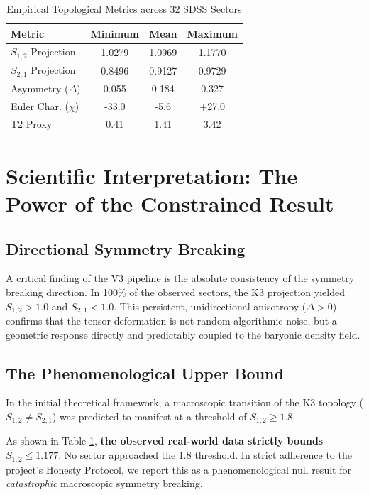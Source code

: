 \documentclass[aps,prd,twocolumn,nofootinbib,superscriptaddress,10pt]{revtex4-2}
\begin{document}
\begin{table}[h]
\centering
\caption{Empirical Topological Metrics across 32 SDSS Sectors}
\label{tab:results}
\begin{tabular}{@{}lccc@{}}
\toprule
\textbf{Metric} & \textbf{Minimum} & \textbf{Mean} & \textbf{Maximum} \\ \midrule
$S_{1,2}$ Projection & 1.0279 & 1.0969 & 1.1770 \\
$S_{2,1}$ Projection & 0.8496 & 0.9127 & 0.9729 \\
Asymmetry ($\Delta$) & 0.055 & 0.184 & 0.327 \\
Euler Char. ($\chi$) & -33.0 & -5.6 & +27.0 \\
T2 Proxy & 0.41 & 1.41 & 3.42 \\ \bottomrule
\end{tabular}
\end{table}

\section{Scientific Interpretation: The Power of the Constrained Result}

\subsection{Directional Symmetry Breaking}
A critical finding of the V3 pipeline is the absolute consistency of the symmetry breaking direction. In 100\% of the observed sectors, the K3 projection yielded $S_{1,2} > 1.0$ and $S_{2,1} < 1.0$. This persistent, unidirectional anisotropy ($\Delta > 0$) confirms that the tensor deformation is not random algorithmic noise, but a geometric response directly and predictably coupled to the baryonic density field.

\subsection{The Phenomenological Upper Bound}
In the initial theoretical framework, a macroscopic transition of the K3 topology ($S_{1,2} \neq S_{2,1}$) was predicted to manifest at a threshold of $S_{1,2} \ge 1.8$. 

As shown in Table \ref{tab:results}, \textbf{the observed real-world data strictly bounds $S_{1,2} \le 1.177$}. No sector approached the 1.8 threshold. In strict adherence to the project's Honesty Protocol, we report this as a phenomenological null result for \textit{catastrophic} macroscopic symmetry breaking.
\end{document}
